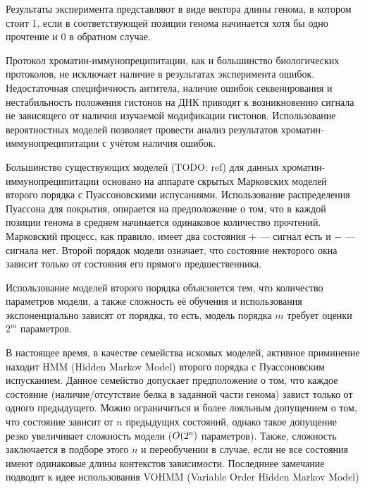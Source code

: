 \documentclass[10pt,a4paper]{article}
\begin{document}
Результаты эксперимента представляют в виде вектора длины генома, в котором
стоит 1, если в соответствующей позиции генома начинается хотя бы одно прочтение
и 0 в обратном случае.


Протокол хроматин-иммунопреципитации, как и большинство биологических
протоколов, не исключает наличие в результатах эксперимента
ошибок. Недостаточная специфичность антитела, наличие ошибок секвенирования
и нестабильность положения гистонов на ДНК приводят к возникновению сигнала не
зависящего от наличия изучаемой модификации гистонов. Использование
вероятностных моделей позволяет провести анализ результатов
хроматин-иммунопреципитации с учётом наличия ошибок.

Большинство существующих моделей (TODO: ref) для данных
хроматин-иммунопреципитации основано на аппарате скрытых Марковских моделей
второго порядка с Пуассоновскими испусаниями. Использование распределения
Пуассона для покрытия, опирается на предположение о том, что в каждой
позиции генома в среднем начинается одинаковое количество прочтений. Марковский
процесс, как правило, имеет два состояния $+$ --- сигнал есть и $-$ --- сигнала
нет. Второй порядок модели означает, что состояние некторого окна зависит только
от состояния его прямого предшественника.

Использование моделей второго порядка объясняется тем, что количество параметров
модели, а также сложность её обучения и использования экспоненциально зависят от
порядка, то есть, модель порядка $m$ требует оценки $2^m$ параметров.


В настоящее время, в качестве семейства искомых моделей, активное приминение находит HMM (Hidden Markov Model)\cite{Rabiner1989} второго порядка с Пуассоновским испусканием.
Данное семейство допускает предположение о том, что каждое состояние (наличие/отсутствие белка в заданной части генома) завист только от одного предыдущего.
Можно ограничиться и более лояльным допущением о том, что состояние зависит от $n$ предыдущих состояний, однако такое допущение резко увеличивает сложность модели ($O(2\textsuperscript{n})$ параметров). Также, сложность заключается в подборе этого $n$ и переобучении в случае, если не все состояния имеют одинаковые длины контекстов зависимости.
Последннее замечание подводит к идее использования VOHMM (Variable Order Hidden Markov Model)\cite{Wang2006}
\end{document}
